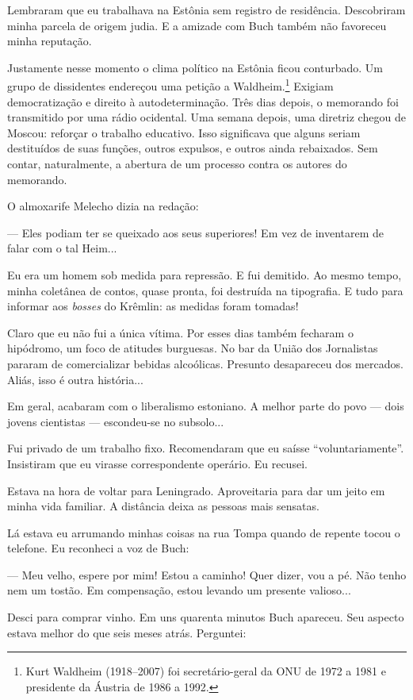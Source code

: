 Lembraram que eu trabalhava na Estônia sem registro de residência.
Descobriram minha parcela de origem judia. E a amizade com Buch também
não favoreceu minha reputação.

Justamente nesse momento o clima político na Estônia ficou conturbado.
Um grupo de dissidentes endereçou uma petição a Waldheim.\footnote{Kurt
  Waldheim (1918--2007) foi secretário-geral da ONU de 1972 a 1981 e
  presidente da Áustria de 1986 a 1992.} Exigiam democratização e
direito à autodeterminação. Três dias depois, o memorando foi
transmitido por uma rádio ocidental. Uma semana depois, uma diretriz
chegou de Moscou: reforçar o trabalho educativo. Isso significava que
alguns seriam destituídos de suas funções, outros expulsos, e outros
ainda rebaixados. Sem contar, naturalmente, a abertura de um processo
contra os autores do memorando.

O almoxarife Melecho dizia na redação:

--- Eles podiam ter se queixado aos seus superiores! Em vez de
inventarem de falar com o tal Heim...

Eu era um homem sob medida para repressão. E fui demitido. Ao mesmo
tempo, minha coletânea de contos, quase pronta, foi destruída na
tipografia. E tudo para informar aos \emph{bosses} do Krêmlin: as
medidas foram tomadas!

Claro que eu não fui a única vítima. Por esses dias também fecharam o
hipódromo, um foco de atitudes burguesas. No bar da União dos
Jornalistas pararam de comercializar bebidas alcoólicas. Presunto
desapareceu dos mercados. Aliás, isso é outra história...

Em geral, acabaram com o liberalismo estoniano. A melhor parte do povo
--- dois jovens cientistas --- escondeu-se no subsolo...

Fui privado de um trabalho fixo. Recomendaram que eu saísse
``voluntariamente''. Insistiram que eu virasse correspondente operário.
Eu recusei.

Estava na hora de voltar para Leningrado. Aproveitaria para dar um jeito
em minha vida familiar. A distância deixa as pessoas mais sensatas.

Lá estava eu arrumando minhas coisas na rua Tompa quando de repente
tocou o telefone. Eu reconheci a voz de Buch:

--- Meu velho, espere por mim! Estou a caminho! Quer dizer, vou a pé.
Não tenho nem um tostão. Em compensação, estou levando um presente
valioso...

Desci para comprar vinho. Em uns quarenta minutos Buch apareceu. Seu
aspecto estava melhor do que seis meses atrás. Perguntei:

